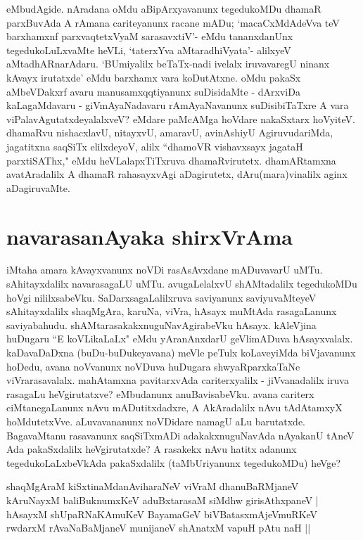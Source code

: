 eMbudAgide. nAradana oMdu aBipArxyavanunx tegedukoMDu dhamaR parxBuvAda A rAmana cariteyanunx racane mADu; `macaCxMdAdeVva teV barxhamxnf parxvaqtetxVyaM sarasavxtiV'- eMdu tananxdanUnx tegedukoLuLxvaMte heVLi, `taterxYva aMtaradhiVyata'-\label{181a} alilxyeV aMtadhARnarAdaru. `BUmiyalilx beTaTx-nadi ivelalx iruvavaregU ninanx kAvayx irutatxde' eMdu barxhamx vara koDutAtxne. oMdu pakaSx aMbeVDakxrf avaru manusamxqqtiyanunx suDisidaMte - dArxviDa kaLagaMdavaru - giVmAyaNadavaru rAmAyaNavanunx suDisibiTaTxre A vara viPalavAgutatxdeyalalxveV? eMdare paMcAMga hoVdare nakaSxtarx hoVyiteV. dhamaRvu nishacxlavU, nitayxvU, amaravU, avinAshiyU AgiruvudariMda, jagatitxna saqSiTx elilxdeyoV, alilx ``dhamoVR vishavxsayx jagataH parxtiSAThx,"\label{182} eMdu heVLalapxTiTxruva dhamaRvirutetx. dhamARtamxna avatAradalilx A dhamaR rahasayxvAgi aDagirutetx, dAru(mara)vinalilx aginx aDagiruvaMte. 

\section*{navarasanAyaka shirxVrAma} 

iMtaha amara kAvayxvanunx noVDi rasAsAvxdane mADuvavarU uMTu. sAhitayxdalilx navarasagaLU uMTu. avugaLelalxvU shAMtadalilx tegedukoMDu hoVgi nililxsabeVku. SaDarxsagaLalilxruva saviyanunx saviyuvaMteyeV sAhitayxdalilx shaqMgAra, karuNa, viVra, hAsayx muMtAda rasagaLanunx saviyabahudu. shAMtarasakakxnuguNavAgirabeVku hAsayx. kAleVjina huDugaru ``E koVLikaLaLx" eMdu yAranAnxdarU geVlimADuva hAsayxvalalx. kaDavaDaDxna (buDu-buDukeyavana) meVle peTulx koLaveyiMda biVjavanunx hoDedu, avana noVvanunx noVDuva huDugara shwyaRparxkaTaNe viVrarasavalalx. mahAtamxna pavitarxvAda cariterxyalilx - jiVvanadalilx iruva rasagaLu heVgirutatxve? eMbudanunx anuBavisabeVku. avana cariterx ciMtanegaLanunx nAvu mADutitxdadxre, A AkAradalilx nAvu tAdAtamxyX hoMdutetxVve. aLuvavananunx noVDidare namagU aLu barutatxde. BagavaMtanu rasavanunx saqSiTxmADi adakakxnuguNavAda nAyakanU tAneV Ada pakaSxdalilx heVgirutatxde? A rasakekx nAvu hatitx adanunx tegedukoLaLxbeVkAda pakaSxdalilx (taMbUriyanunx tegedukoMDu) heVge? 

\begin{shloka}
shaqMgAraM kiSxtinaMdanAviharaNeV viVraM dhanuBaRMjaneV\label{182a}\\ 
kAruNayxM baliBuknumxKeV aduBxtarasaM siMdhw girisAthxpaneV |\\ 
hAsayxM shUpaRNaKAmuKeV BayamaGeV biVBatasxmAjeVmuRKeV\\ 
rwdarxM rAvaNaBaMjaneV munijaneV shAnatxM vapuH pAtu naH || 
\end{shloka}

